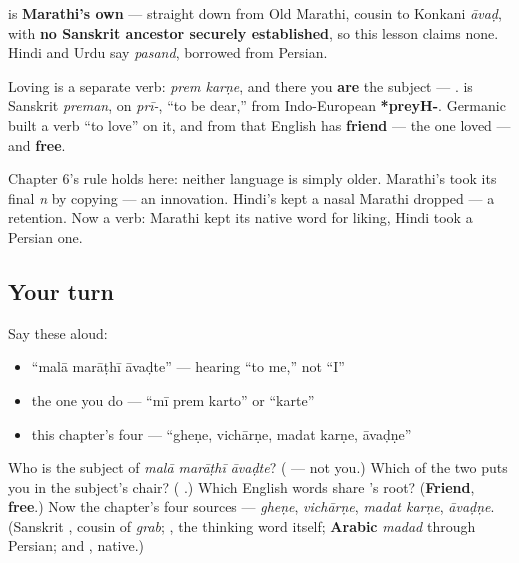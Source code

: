 \begin{cousinweb}
\textbf{} is \textbf{Marathi's own} — straight down from Old Marathi, cousin to Konkani \emph{āvaḍ}, with \textbf{no Sanskrit ancestor securely established}, so this lesson claims none. Hindi and Urdu say \textbf{} \emph{pasand}, borrowed from Persian.

Loving is a separate verb: \textbf{ } \emph{prem karṇe}, and there you \textbf{are} the subject — \textbf{  }. \textbf{} is Sanskrit \emph{preman}, on \textbf{} \emph{prī-}, \textquotedblleft{}to be dear,\textquotedblright{} from Indo-European \textbf{*preyH-}. Germanic built a verb \textquotedblleft{}to love\textquotedblright{} on it, and from that English has \textbf{friend} — the one loved — and \textbf{free}.
\end{cousinweb}

\begin{culture}
Chapter 6's rule holds here: neither language is simply older. Marathi's \textbf{} took its final \emph{n} by copying \textbf{} — an innovation. Hindi's \textbf{} kept a nasal Marathi dropped — a retention. Now a verb: Marathi kept its native word for liking, Hindi took a Persian one.
\end{culture}

\subsection*{Your turn}
Say these aloud:

\begin{itemize}
\raggedright
  \item \textquotedblleft{}malā marāṭhī āvaḍte\textquotedblright{} — hearing \textquotedblleft{}to me,\textquotedblright{} not \textquotedblleft{}I\textquotedblright{}
  \item the one you do — \textquotedblleft{}mī prem karto\textquotedblright{} or \textquotedblleft{}karte\textquotedblright{}
  \item this chapter's four — \textquotedblleft{}gheṇe, vichārṇe, madat karṇe, āvaḍṇe\textquotedblright{}
\end{itemize}

\begin{tcolorbox}[breakable,colback=teal!4,colframe=teal!35!black,title={Before you move on}]
Who is the subject of \emph{malā marāṭhī āvaḍte}? (\textbf{} — not you.) Which of the two puts you in the subject's chair? (\textbf{ }.) Which English words share \textbf{}'s root? (\textbf{Friend}, \textbf{free}.) Now the chapter's four sources — \emph{gheṇe}, \emph{vichārṇe}, \emph{madat karṇe}, \emph{āvaḍṇe}. (Sanskrit \textbf{}, cousin of \emph{grab}; \textbf{}, the thinking word itself; \textbf{Arabic} \emph{madad} through Persian; and \textbf{}, native.)
\end{tcolorbox}
